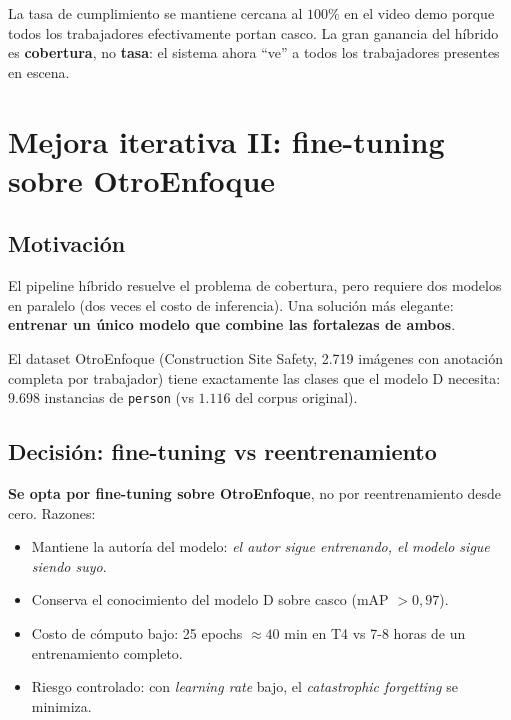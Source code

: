 \documentclass[11pt,a4paper]{article}
\begin{document}
\begin{nota}
La tasa de cumplimiento se mantiene cercana al $100\%$ en el video
demo porque todos los trabajadores efectivamente portan casco. La gran
ganancia del híbrido es \textbf{cobertura}, no \textbf{tasa}: el
sistema ahora ``ve'' a todos los trabajadores presentes en escena.
\end{nota}

\section{Mejora iterativa II: fine-tuning sobre OtroEnfoque}
\label{sec:finetuning}

\subsection{Motivación}

El pipeline híbrido resuelve el problema de cobertura, pero requiere
dos modelos en paralelo (dos veces el costo de inferencia). Una
solución más elegante: \textbf{entrenar un único modelo que combine las
fortalezas de ambos}.

El dataset OtroEnfoque (Construction Site Safety, 2.719 imágenes con
anotación completa por trabajador) tiene exactamente las clases que el
modelo D necesita: $9.698$ instancias de \texttt{person} (vs $1.116$
del corpus original).

\subsection{Decisión: fine-tuning vs reentrenamiento}

\begin{decision}
\textbf{Se opta por fine-tuning sobre OtroEnfoque}, no por
reentrenamiento desde cero. Razones:
\begin{itemize}[leftmargin=*]
    \item Mantiene la autoría del modelo: \emph{el autor sigue
    entrenando, el modelo sigue siendo suyo}.
    \item Conserva el conocimiento del modelo D sobre casco (mAP $>0{,}97$).
    \item Costo de cómputo bajo: 25 epochs $\approx 40$ min en T4 vs
    7-8 horas de un entrenamiento completo.
    \item Riesgo controlado: con \textit{learning rate} bajo, el
    \emph{catastrophic forgetting} se minimiza.
\end{itemize}
\end{decision}
\end{document}
